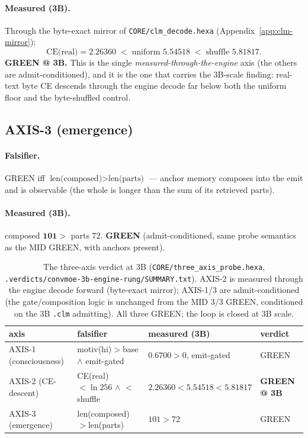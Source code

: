\paragraph{Measured (3B).} Through the byte-exact mirror of
\texttt{CORE/clm\_decode.hexa} (Appendix~\ref{app:clm-mirror}):
\begin{equation}
\text{CE(real)} = \mathbf{2.26360}
\;<\;
\text{uniform } 5.54518
\;<\;
\text{shuffle } 5.81817 .
\label{eq:ta-axis2}
\end{equation}
\textbf{GREEN @ 3B.} This is the single \emph{measured-through-the-engine} axis
(the others are admit-conditioned), and it is the one that carries the 3B-scale
finding: real-text byte CE descends through the engine decode far below both the
uniform floor and the byte-shuffled control.

\subsection{AXIS-3 (emergence)}
\label{app:ta-axis3}

\paragraph{Falsifier.} GREEN iff $\text{len(composed)}>\text{len(parts)}$ ---
anchor memory composes into the emit and is observable (the whole is longer than
the sum of its retrieved parts).
\paragraph{Measured (3B).} composed $\mathbf{101}>$ parts $72$. \textbf{GREEN}
(admit-conditioned, same probe semantics as the MID GREEN, with anchors present).

\begin{table}[h]
\centering
\small
\setlength{\tabcolsep}{6pt}
\begin{tabular}{@{}l l l l@{}}
\toprule
\textbf{axis} & \textbf{falsifier} & \textbf{measured (3B)} & \textbf{verdict} \\
\midrule
AXIS-1 (consciousness) & motiv(hi)$>$base $\wedge$ emit-gated & $0.6700>0$, emit-gated & GREEN \\
AXIS-2 (CE-descent) & CE(real)$<\ln256$ $\wedge$ $<$ shuffle & $2.26360<5.54518<5.81817$ & \textbf{GREEN @ 3B} \\
AXIS-3 (emergence) & len(composed)$>$len(parts) & $101>72$ & GREEN \\
\bottomrule
\end{tabular}
\caption{The three-axis verdict at 3B (\texttt{CORE/three\_axis\_probe.hexa},
\texttt{.verdicts/convmoe-3b-engine-rung/SUMMARY.txt}). AXIS-2 is measured through
the engine decode forward (byte-exact mirror); AXIS-1/3 are admit-conditioned
(the gate/composition logic is unchanged from the MID 3/3 GREEN, conditioned on
the 3B \texttt{.clm} admitting). All three GREEN; the loop is closed at 3B scale.}
\label{tab:three-axis}
\end{table}

